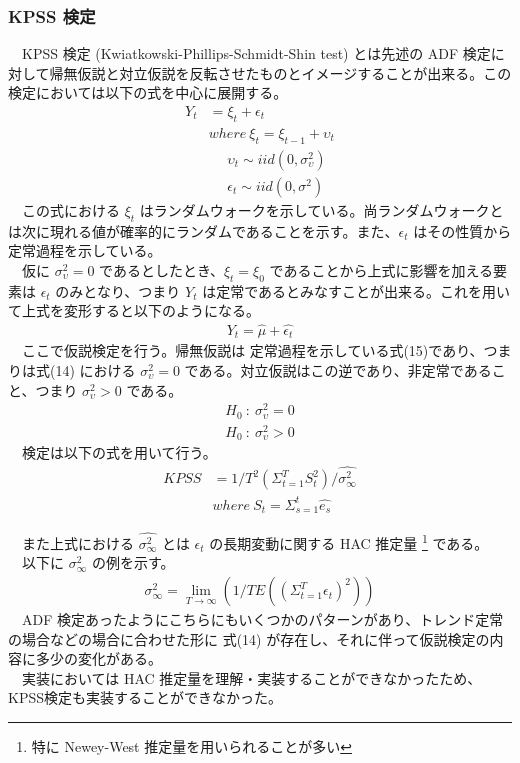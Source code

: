 \documentclass{scrartcl}
\begin{document}
\subsubsection{KPSS 検定}
\label{sec:orgc451067}
　KPSS 検定 (Kwiatkowski-Phillips-Schmidt-Shin test) とは先述の ADF 検定に対して帰無仮説と対立仮説を反転させたものとイメージすることが出来る。この検定においては以下の式を中心に展開する。\\
\begin{align}
Y_t &= \xi_t + \epsilon_t \nonumber \\
 &where \ \xi_t = \xi_{t-1} + \upsilon_t \nonumber \\
 &\ \ \ \ \ \ \upsilon_t \sim iid(0, \sigma_{\upsilon}^2) \nonumber \\
 &\ \ \ \ \ \ \epsilon_t \sim iid(0, \sigma^2)
\end{align}
　この式における \(\xi_t\) はランダムウォークを示している。尚ランダムウォークとは次に現れる値が確率的にランダムであることを示す。また、\(\epsilon_t\) はその性質から定常過程を示している。\\
　仮に \(\sigma_{\upsilon}^2 = 0\) であるとしたとき、\(\xi_t = \xi_0\) であることから上式に影響を加える要素は \(\epsilon_t\) のみとなり、つまり \(Y_t\) は定常であるとみなすことが出来る。これを用いて上式を変形すると以下のようになる。\\
\begin{align}
Y_t = \hat{\mu} + \hat{\epsilon_t}
\end{align}
　ここで仮説検定を行う。帰無仮説は 定常過程を示している式(15)であり、つまりは式(14) における \(\sigma_{\upsilon}^2 = 0\) である。対立仮説はこの逆であり、非定常であること、つまり \(\sigma_{\upsilon}^2 > 0\) である。\\
\begin{align}
H_0 \ :\ \sigma_{\upsilon}^2 = 0 \\
H_0 \ :\ \sigma_{\upsilon}^2 > 0
\end{align}
　検定は以下の式を用いて行う。\\
\begin{align}
KPSS &= 1/T^2 (\Sigma^{T}_{t = 1}S_t^2)/ \hat{\sigma^2_\infty} \nonumber \\ 
&where\  S_t = \Sigma_{s=1}^t \hat{e_s} 
\end{align}

　また上式における \(\hat{\sigma^2_\infty}\) とは \(\epsilon_t\) の長期変動に関する HAC 推定量 \footnote{特に Newey-West 推定量を用いられることが多い} である。\\
　以下に \(\sigma^2_\infty\) の例を示す。\cite{STAN:STAN272}
\begin{align}
\sigma^2_\infty = \lim_{T \rightarrow \infty} (1/T E((\Sigma_{t=1}^T \epsilon_t)^2))
\end{align}
　ADF 検定あったようにこちらにもいくつかのパターンがあり、トレンド定常の場合などの場合に合わせた形に 式(14) が存在し、それに伴って仮説検定の内容に多少の変化がある。\\
　実装においては HAC 推定量を理解・実装することができなかったため、KPSS検定も実装することができなかった。\\
\end{document}
